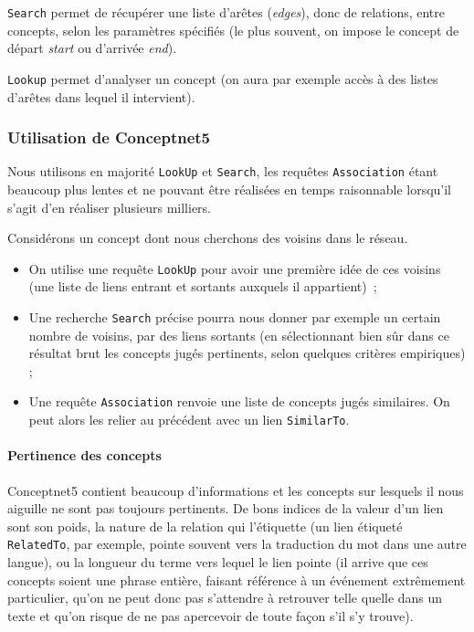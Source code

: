 \documentclass[a4paper, 12pt]{article}
\newcommand{\ang}[1]{\textit{#1}}%
\begin{document}
\texttt{Search} permet de récupérer une liste d'arêtes (\ang{edges}), donc de relations, entre concepts, selon les paramètres spécifiés (le plus souvent, on impose le concept de départ \ang{start} ou d'arrivée \ang{end}).

\texttt{Lookup} permet d'analyser un concept (on aura par exemple accès à des listes d'arêtes dans lequel il intervient).


\subsubsection{Utilisation de Conceptnet5}

Nous utilisons en majorité \texttt{LookUp} et \texttt{Search}, les requêtes \texttt{Association} étant beaucoup plus lentes et ne pouvant être réalisées en temps raisonnable lorsqu'il s'agit d'en réaliser plusieurs milliers.

Considérons un concept dont nous cherchons des voisins dans le réseau.
\begin{itemize}
 \item On utilise une requête \verb|LookUp| pour avoir une première idée de ces voisins (une liste de liens entrant et sortants auxquels il appartient)~;
 \item Une recherche \verb|Search| précise pourra nous donner par exemple un certain nombre de voisins, par des liens sortants (en sélectionnant bien sûr dans ce résultat brut les concepts jugés pertinents, selon quelques critères empiriques) ;
 \item Une requête \verb|Association| renvoie une liste de concepts jugés similaires. On peut alors les relier au précédent avec un lien \verb|SimilarTo|.
\end{itemize}

\paragraph{Pertinence des concepts}
Conceptnet5 contient beaucoup d'informations et les concepts sur lesquels il nous aiguille ne sont pas toujours pertinents. De bons indices de la valeur d'un lien sont son poids, la nature de la relation qui l'étiquette (un lien étiqueté \verb|RelatedTo|, par exemple, pointe souvent vers la traduction du mot dans une autre langue), ou la longueur du terme vers lequel le lien pointe (il arrive que ces concepts soient une phrase entière, faisant référence à un événement extrêmement particulier, qu'on ne peut donc pas s'attendre à retrouver telle quelle dans un texte et qu'on risque de ne pas apercevoir de toute façon s'il s'y trouve).
\end{document}

